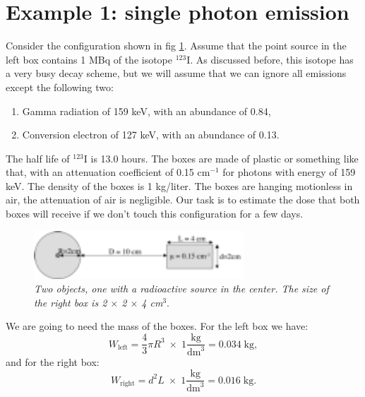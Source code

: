 \section{Example 1: single photon emission}
Consider the configuration shown in fig \ref{fig:biol-singlephoton}.
Assume that the point source in the left box contains 1 MBq of the
isotope $^{123}$I. As discussed before, this isotope has a very
busy decay scheme, but we will assume that we can ignore all emissions
except the following two:
\begin{enumerate}
  \item Gamma radiation of 159 keV, with an abundance of 0.84,
  \item Conversion electron of 127 keV, with an abundance of 0.13.
\end{enumerate}
The half life of $^{123}$I is 13.0 hours.
The boxes are made of plastic or something like that, with an
attenuation coefficient of 0.15 cm$^{-1}$ for photons with energy
of 159 keV. The density of the boxes is 1 kg/liter.
The boxes are hanging motionless in air, the attenuation
of air is negligible. Our task is to estimate the dose that both boxes
will receive if we don't touch this configuration for a few days.
%
%
\begin{figure}[tb]
\centering
\includegraphics[width=0.7\textwidth]{figs/fig_biol_singlephoton.pdf}
\caption{\label{fig:biol-singlephoton} \emph{Two objects, one with a
radioactive source in the center. The size of the right box is
2 $\times$ 2 $\times$ 4 cm$^3$}.}
\end{figure}

We are going to need the mass of the boxes. For the left box we
have:
\begin{equation}
  W_{\mbox{left}} = \frac{4}{3} \pi R^3 \; \times \; 1 \frac{\mbox{kg}}{\mbox{dm}^3}
      = 0.034 \;\mbox{kg},
\end{equation}
and for the right box:
\begin{equation}
  W_{\mbox{right}} = d^2 L\; \times \; 1 \frac{\mbox{kg}}{\mbox{dm}^3}
      = 0.016 \;\mbox{kg}.
\end{equation}

